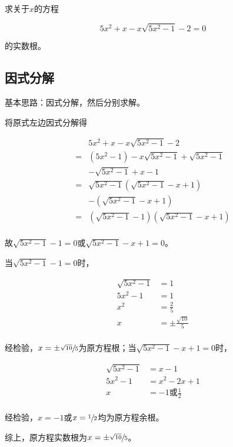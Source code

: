 

求关于$x$的方程

\[ 5x^2 + x - x\sqrt{5x^2 - 1} - 2 = 0 \]

的实数根。


\subsection{因式分解}

基本思路：因式分解，然后分别求解。

将原式左边因式分解得

\begin{align*}
  & 5x^2 + x - x\sqrt{5x^2 - 1} - 2 \\
  ={}& (5x^2 - 1) - x\sqrt{5x^2 - 1} + \sqrt{5x^2 - 1} \\
    &- \sqrt{5x^2 - 1} + x - 1 \\
  ={}& \sqrt{5x^2 - 1}(\sqrt{5x^2 - 1} - x + 1) \\
    &- (\sqrt{5x^2 - 1} - x + 1) \\
  ={}& (\sqrt{5x^2 - 1} - 1)(\sqrt{5x^2 - 1} - x + 1) \\
\end{align*}

故$\sqrt{5x^2 - 1} - 1 = 0$或$\sqrt{5x^2 - 1} - x + 1 = 0$。

当$\sqrt{5x^2 - 1} - 1 = 0$时，

\begin{align*}
  \sqrt{5x^2 - 1} &= 1 \\
  5x^2 - 1 &= 1 \\
  x^2 &= \frac25 \\
  x &= \pm\frac{\sqrt{10}}5 \\
\end{align*}

经检验，$x = \pm\sfrac{\sqrt{10}}5$为原方程根；当$\sqrt{5x^2 - 1} - x + 1 = 0$时，

\begin{align*}
  \sqrt{5x^2 - 1} &= x - 1 \\
  5x^2 - 1 &= x^2 - 2x + 1 \\
  x &= -1 \text{或} \frac12 \\
\end{align*}

经检验，$x = -1$或$x = \sfrac12$均为原方程余根。

综上，原方程实数根为$x = \pm\sfrac{\sqrt{10}}5$。
